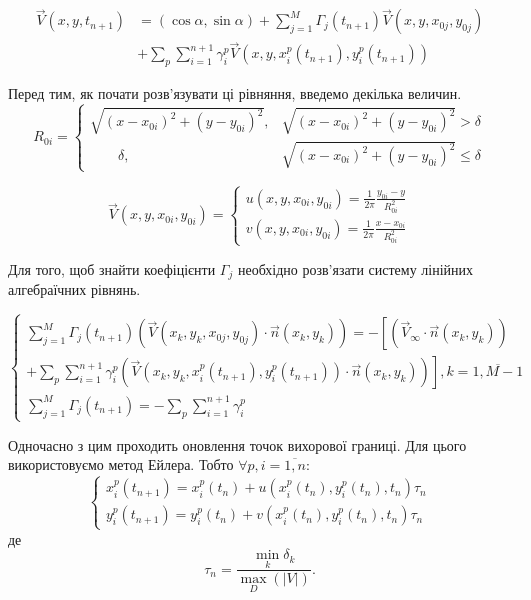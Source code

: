 \documentclass[a4paper,12pt]{article}
\begin{document}
	\begin{align}
		\vec{V}(x,y,t_{n+1}) &= (\cos \alpha, \sin \alpha) + \sum_{j=1}^{M} \Gamma_{j}(t_{n+1}) \vec{V}(x,y,x_{0j}, y_{0j}) \nonumber \\ &+\sum_p \sum_{i=1}^{n+1} \gamma_{i}^{p} \vec{V}(x,y,x_{i}^{p}(t_{n+1}), y_{i}^{p}(t_{n+1})) \nonumber
	\end{align}

	Перед тим, як почати розв'язувати ці рівняння, введемо декілька величин.
	\begin{equation*}
		R_{0i} = 
		\begin{cases}
			\sqrt{ (x - x_{0i})^2 + (y - y_{0i})^2 }, &\sqrt{ (x - x_{0i})^2 + (y - y_{0i})^2 } > \delta
			\\
			\qquad \delta, &\sqrt{ (x - x_{0i})^2 + (y - y_{0i})^2 } \le \delta
		\end{cases}
	\end{equation*}
	
	\begin{equation*}
		\vec{V}(x,y,x_{0i}, y_{0i}) =
		\begin{cases}
			u(x,y,x_{0i}, y_{0i}) = \frac{1}{2 \pi} \frac{y_{0i} - y}{R_{0i}^2}
			\\
			v(x,y,x_{0i}, y_{0i}) = \frac{1}{2 \pi} \frac{x - x_{0i} }{R_{0i}^2}
		\end{cases}
	\end{equation*}
	
	Для того, щоб знайти коефіцієнти $\Gamma_{j}$ необхідно розв'язати систему лінійних алгебраїчних рівнянь.
	
	\begin{equation*}
		\begin{cases}
			\sum_{j=1}^{M} \Gamma_{j}(t_{n+1})\left( \vec{V}(x_k,y_k, x_{0j}, y_{0j}) \cdot \vec{n}(x_k,y_k) \right) = - \left[ \left(  \vec{V}_{\infty} \cdot \vec{n}(x_k, y_k) \right) \right.
			\\
			+ \left. \sum_p \sum_{i=1}^{n+1} \gamma_{i}^{p} \left( \vec{V}(x_k,y_k,x_{i}^{p}(t_{n+1}), y_{i}^{p}(t_{n+1})) \cdot \vec{n}(x_k, y_k) \right)\right], k = \overline{1,M-1}
			\\
			\sum_{j=1}^{M} \Gamma_{j}(t_{n+1}) = - \sum_p \sum_{i=1}^{n+1} \gamma_{i}^{p}
		\end{cases}
	\end{equation*}
	
	Одночасно з цим проходить оновлення точок вихорової границі. Для цього використовуємо метод Ейлера. Тобто $\forall p, i = \overline{1,n}$:
	\begin{equation*}
		\begin{cases}
			x_{i}^{p}(t_{n+1}) = x_{i}^{p}(t_n) + u(x_{i}^{p}(t_n), y_{i}^{p}(t_n), t_n)\tau_n
			\\
			y_{i}^{p}(t_{n+1}) = y_{i}^{p}(t_n) + v(x_{i}^{p}(t_n), y_{i}^{p}(t_n), t_n)\tau_n
		\end{cases}
	\end{equation*}
	де $$\tau_n = \frac{\min_{k} \delta_k}{\max_{D}(|V|)}.$$
\end{document}
